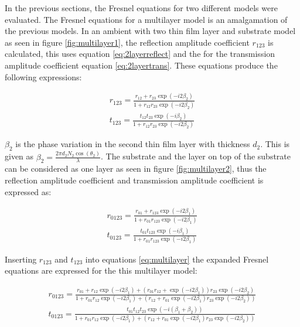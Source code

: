 \documentclass[MasterThesisMain.tex]{subfiles}
\begin{document}
In the previous sections, the Fresnel equations for two different models were evaluated. The Fresnel equations for a multilayer model is an amalgamation of the previous models. In an ambient with two thin film layer and substrate model as seen in figure \ref{fig:multilayer1}, the reflection amplitude coefficient $r_{123}$ is calculated, this uses equation \ref{eq:2layerreflect} and the for the transmission amplitude coefficient equation \ref{eq:2layertrans}. These equations produce the following expressions:

\begin{align}
r_{123}= \frac{r_{12}+r_{23}\exp(-i2\beta_2)}{1+r_{12}r_{23}\exp(-i2\beta_2)}\\
t_{123}=\frac{t_{12}t_{23}\exp(-i\beta_2)}{1+r_{12}r_{23}\exp(-i2\beta_2)}
\end{align}

$\beta_2$ is the phase variation in the second thin film layer with thickness $d_2$. This is given as $\beta_2=\frac{2\pi d_2N_2\cos(\theta_2)}{\lambda}$. The substrate and the layer on top of the substrate can be considered as one layer as seen in figure \ref{fig:multilayer2}, thus the reflection amplitude coefficient and transmission amplitude coefficient is expressed as:         

\begin{align}\label{eq:multilayer}
r_{0123}= \frac{r_{01}+r_{123}\exp(-i2\beta_1)}{1+r_{01}r_{123}\exp(-i2\beta_1)}\\
t_{0123}=\frac{t_{01}t_{123}\exp(-i\beta_1)}{1+r_{01}r_{123}\exp(-i2\beta_1)}
\end{align}

Inserting $r_{123}$ and $t_{123}$ into equations \ref{eq:multilayer} the expanded Fresnel equations are expressed for the this multilayer model:

\begin{align}
r_{0123} = \frac{r_{01}+r_{12}\exp(-i2\beta_1)+(r_{01}r_{12}+\exp(-i2\beta_1))r_{23}\exp(-i2\beta_2)}{1+r_{01}r_{12}\exp(-i2\beta_1)+(r_{12}+r_{01}\exp(-i2\beta_1)r_{23}\exp(-i2\beta_2))}\\
t_{0123} = \frac{t_{01}t_{12}t_{23}\exp(-i(\beta_1+\beta_2))}{1+r_{01}r_{12}\exp(-i2\beta_1)+(r_{12}+r_{01}\exp(-i2\beta_1)r_{23}\exp(-i2\beta_2))}
\end{align}
\end{document}

